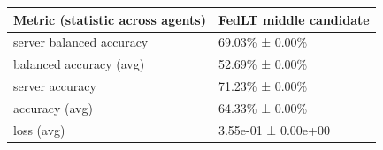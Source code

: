 \begin{tabular}{ll}
\hline
 Metric (statistic across agents)   & FedLT middle candidate   \\
\hline
 server balanced accuracy           & 69.03\% ± 0.00\%           \\
 balanced accuracy (avg)            & 52.69\% ± 0.00\%           \\
 server accuracy                    & 71.23\% ± 0.00\%           \\
 accuracy (avg)                     & 64.33\% ± 0.00\%           \\
 loss (avg)                         & 3.55e-01 ± 0.00e+00      \\
\hline
\end{tabular}